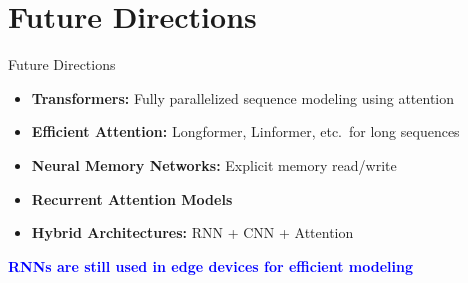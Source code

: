 \section{Future Directions}
\begin{frame}{Future Directions}
  \small
  \begin{itemize}
    \item \textbf{Transformers:} Fully parallelized sequence modeling using attention
    \item \textbf{Efficient Attention:} Longformer, Linformer, etc.\ for long sequences
    \item \textbf{Neural Memory Networks:} Explicit memory read/write
    \item \textbf{Recurrent Attention Models}
    \item \textbf{Hybrid Architectures:} RNN + CNN + Attention
  \end{itemize}
  \vspace{1em}
  \textcolor{blue}{\textbf{RNNs are still used in edge devices for efficient modeling}}
\end{frame}